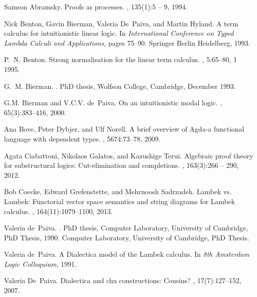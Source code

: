 \documentclass{llncs}
\begin{document}
\begin{thebibliography}{10}

Samson Abramsky.
\newblock Proofs as processes.
, 135(1):5 -- 9, 1994.

Nick Benton, Gavin Bierman, Valeria De~Paiva, and Martin Hyland.
\newblock A term calculus for intuitionistic linear logic.
\newblock In {\em International Conference on Typed Lambda Calculi and
  Applications}, pages 75--90. Springer Berlin Heidelberg, 1993.

P.~N. Benton.
\newblock Strong normalisation for the linear term calculus.
, 5:65--80, 1 1995.

G.~M. Bierman.
.
\newblock PhD thesis, Wolfson College, Cambridge, December 1993.

G.M. Bierman and V.C.V. de~Paiva.
\newblock On an intuitionistic modal logic.
, 65(3):383--416, 2000.

Ana Bove, Peter Dybjer, and Ulf Norell.
\newblock A brief overview of {A}gda-a functional language with dependent
  types.
, 5674:73--78, 2009.

Agata Ciabattoni, Nikolaos Galatos, and Kazushige Terui.
\newblock Algebraic proof theory for substructural logics: Cut-elimination and
  completions.
, 163(3):266 -- 290, 2012.

Bob Coecke, Edward Grefenstette, and Mehrnoosh Sadrzadeh.
\newblock Lambek vs. {L}ambek: Functorial vector space semantics and string
  diagrams for {L}ambek calculus.
, 164(11):1079--1100, 2013.

Valeria de~Paiva.
.
\newblock PhD thesis, Computer Laboratory, University of Cambridge, PhD Thesis,
  1990.
\newblock Computer Laboratory, University of Cambridge, PhD Thesis.

Valeria de~Paiva.
\newblock A {D}ialectica model of the {L}ambek calculus.
\newblock In {\em 8th Amsterdam Logic Colloquium}, 1991.

Valeria De~Paiva.
\newblock Dialectica and chu constructions: Cousins?
, 17(7):127--152, 2007.


\end{thebibliography}
\end{document}
